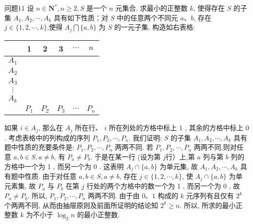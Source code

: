 问题11 设 $n \in \mathbf{N}^*, n \geqslant 2, S$ 是一个 $n$ 元集合.
求最小的正整数 $k$, 使得存在 $S$ 的子集 $A_1, A_2, \cdots, A_k$ 具有如下性质：对 $S$ 中的任意两个不同元 $a 、 b$, 存在 $j \in\{1,2, \cdots, k\}$,使得 $A_j \bigcap\{a, b\}$ 为 $S$ 的一元子集.
构造如右表格: 
\begin{tabular}{|c|c|c|c|c|c|}
\hline & 1 & 2 & 3 & $\cdots$ & $n$ \\
\hline$A_1$ & & & & & \\
\hline$A_2$ & & & & & \\
\hline$A_3$ & & & & & \\
\hline$\vdots$ & & & & & \\
\hline$A_k$ & & & & & \\
\hline & $P_1$ & $P_2$ & $P_3$ & $\cdots$ & $P_n$ \\
\hline
\end{tabular}
如果 $i \in A_j$, 那么在 $A_j$ 所在行、 $i$ 所在列处的方格中标上 1 , 其余的方格中标上 0 . 考虑表格中的列构成的序列 $P_1, P_2, \cdots, P_n$. 我们证明: $S$ 的子集 $A_1, A_2, \cdots, A_k$ 具有题中性质的充要条件是: $P_1, P_2, \cdots, P_n$ 两两不同.
若 $P_1, P_2, \cdots, P_n$ 两两不同,则对任意 $a, b \in S, a \neq b$, 有 $P_a \neq P_b$. 于是在某一行 (设为第 $j$行）上,第 $a$ 列与第 $b$ 列的方格中一个为 1 , 而另一个为 0 . 这表明 $A_j \cap\{a, b\}$ 为单元集, 故 $A_1, A_2, \cdots, A_k$ 具有题中性质.
由于对任意 $a, b \in S, a \neq b$, 存在 $j \in\{1,2, \cdots, k\}$, 使 $A_j \cap\{a, b\}$ 为单元素集, 故 $P_a$ 与 $P_b$ 在第 $j$ 行处的两个方格中的数一个为 1 , 而另一个为 0 , 故 $P_a \neq P_b$. 所以, $P_1, P_2, \cdots, P_n$ 两两不同.
由于由 $0 、 1$ 构成的 $k$ 元序列有且仅有 $2^k$ 个两两不同, 从而由抽屉原则及前面所证明的结论知 $2^k \geqslant n$. 所以, 所求的最小正整数 $k$ 为不小于 $\log _2 n$ 的最小正整数.



